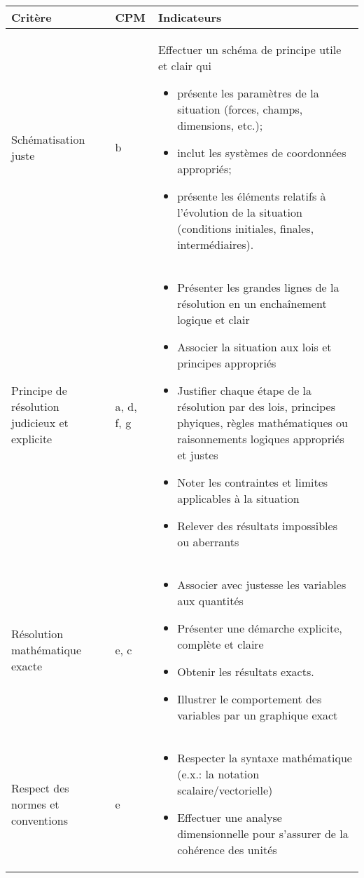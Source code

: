 \documentclass[nofonts]{tufte-handout}
\begin{document}
\begin{fullwidth}
\noindent\begin{tabular}{p{3cm}p{1cm}p{13cm}}
  \toprule
  Critère  &  CPM  &  Indicateurs   \\
  \midrule
  Schématisation juste
    &  b
    &  Effectuer un schéma de principe utile et clair qui
       \begin{itemize}
         \item présente les paramètres de la situation (forces, champs, dimensions, etc.);
         \item inclut les systèmes de coordonnées appropriés;
         \item présente les éléments relatifs à l'évolution de la situation (conditions initiales, finales, intermédiaires).
       \end{itemize}
       \\\midrule
  Principe de résolution judicieux et explicite
    & a, d, f, g
    & \vspace{-\baselineskip}\begin{itemize}
        \item Présenter les grandes lignes de la résolution en un enchaînement logique et clair
        \item Associer la situation aux lois et principes appropriés
        \item Justifier chaque étape de la résolution par des lois, principes
          phyiques, règles mathématiques ou raisonnements logiques appropriés et
          justes
        \item Noter les contraintes et limites applicables à la situation
        \item Relever des résultats impossibles ou aberrants
      \end{itemize}
      \\\midrule
  Résolution mathématique exacte
    &  e, c
    & \vspace{-\baselineskip}\begin{itemize}
        \item Associer avec justesse les variables aux quantités
        \item Présenter une démarche explicite, complète et claire
        \item Obtenir les résultats exacts.
        \item Illustrer le comportement des variables par un graphique exact
      \end{itemize}  \\\midrule
  Respect des normes et conventions
    &  e
    & \vspace{-\baselineskip}\begin{itemize}
        \item Respecter la syntaxe mathématique (e.x.: la notation scalaire/vectorielle)
        \item Effectuer une analyse dimensionnelle pour s'assurer de la cohérence des unités
      \end{itemize}  \\
  \bottomrule
\end{tabular}
\end{fullwidth}
\end{document}
